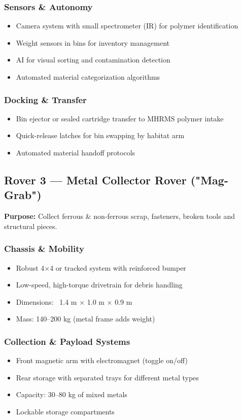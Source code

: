 \documentclass[12pt, a4paper]{article}
\begin{document}
\subsubsection{Sensors \& Autonomy}
\begin{itemize}
    \item Camera system with small spectrometer (IR) for polymer identification
    \item Weight sensors in bins for inventory management
    \item AI for visual sorting and contamination detection
    \item Automated material categorization algorithms
\end{itemize}

\subsubsection{Docking \& Transfer}
\begin{itemize}
    \item Bin ejector or sealed cartridge transfer to MHRMS polymer intake
    \item Quick-release latches for bin swapping by habitat arm
    \item Automated material handoff protocols
\end{itemize}

\subsection{Rover 3 — Metal Collector Rover ("Mag-Grab")}

\textbf{Purpose:} Collect ferrous \& non-ferrous scrap, fasteners, broken tools and structural pieces.

\subsubsection{Chassis \& Mobility}
\begin{itemize}
    \item Robust 4×4 or tracked system with reinforced bumper
    \item Low-speed, high-torque drivetrain for debris handling
    \item Dimensions: ~1.4 m × 1.0 m × 0.9 m
    \item Mass: 140–200 kg (metal frame adds weight)
\end{itemize}

\subsubsection{Collection \& Payload Systems}
\begin{itemize}
    \item Front magnetic arm with electromagnet (toggle on/off)
    \item Rear storage with separated trays for different metal types
    \item Capacity: 30–80 kg of mixed metals
    \item Lockable storage compartments
\end{itemize}
\end{document}
